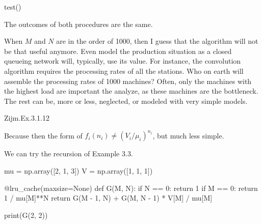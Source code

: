 \begin{exercise}
\begin{solution}
\begin{pyconsole}
test()
  
\end{pyconsole}

The  outcomes of both procedures are the same. 

When $M$ and $N$ are in the order of 1000, then I guess that the
algorithm will not be that useful anymore. Even model the production
situation as a closed queueing network will, typically, use its
value. For instance, the convolution algorithm requires the processing
rates of all the stations. Who on earth will assemble the processing
rates of 1000 machines? Often, only the machines with the highest load
are important the analyze, as these machines are the bottleneck. The
rest can be, more or less, neglected, or modeled with very simple
models.

\end{solution}
\end{exercise}

\begin{exercise}
Zijm.Ex.3.1.12
\begin{solution}
  Because then the form of $f_i(n_i)\neq (V_i/\mu_i)^{n_i}$, but much
  less simple.

We can try the recursion of Example 3.3.

\begin{pyconsole}
mu = np.array([2, 1, 3])
V = np.array([1, 1, 1])


@lru_cache(maxsize=None)
def G(M, N):
    if N == 0:
        return 1
    if M == 0:
        return 1 / mu[M]**N
    return G(M - 1, N) + G(M, N - 1) * V[M] / mu[M]

print(G(2, 2))
  
\end{pyconsole}
\end{solution}
\end{exercise}









